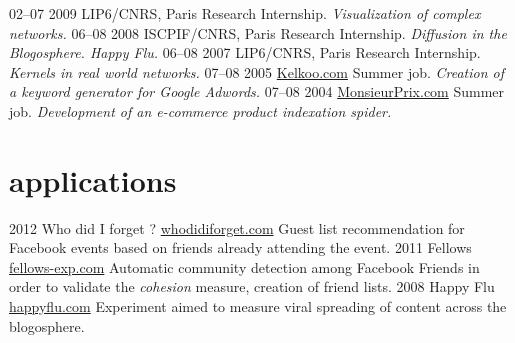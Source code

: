 \documentclass{cv}
\begin{document}
\begin{entrylist}
  \entry
    {02–07 2009}
    {LIP6/CNRS, Paris}
    {Research Internship.}
    {\emph{Visualization of complex networks.}}
  \entry
    {06–08 2008}
    {ISCPIF/CNRS, Paris}
    {Research Internship.}
    {\emph{Diffusion in the Blogosphere. Happy Flu.}}
  \entry
    {06–08 2007}
    {LIP6/CNRS, Paris}
    {Research Internship.}
    {\emph{Kernels in real world networks.}}
  \entry
    {07–08 2005}
    {\href{http://www.kelkoo.com}{Kelkoo.com}}
    {Summer job.}
    {\emph{Creation of a keyword generator for Google Adwords.}}
  \entry
    {07–08 2004}
    {\href{http://www.monsieurprix.com}{MonsieurPrix.com}}
    {Summer job.}
    {\emph{Development of an e-commerce product indexation spider.}}
\end{entrylist}

\section{applications}

\begin{entrylist}
  \entry
    {2012}
    {Who did I forget ?}
    {\href{http://whodidiforget.com}{whodidiforget.com}}
    {Guest list recommendation for Facebook events based on friends already attending the event.}
  \entry
    {2011}
    {Fellows}
    {\href{http://fellows-exp.com}{fellows-exp.com}}
    {Automatic community detection among Facebook Friends in order to validate the \emph{cohesion} measure, creation of friend lists.}
  \entry
    {2008}
    {Happy Flu}
    {\href{http://happyflu.com}{happyflu.com}}
    {Experiment aimed to measure viral spreading of content across the blogosphere.}
\end{entrylist}
\end{document}
